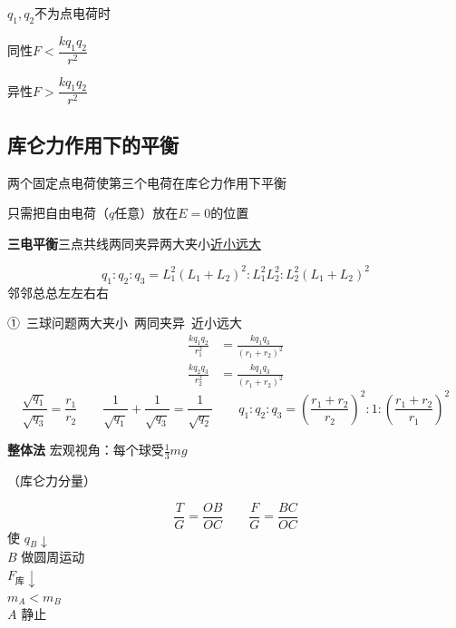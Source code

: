 $q_1,q_2$不为点电荷时


同性\quad $F<\dfrac{kq_1q_2}{r^2}$

异性\quad $F>\dfrac{kq_1q_2}{r^2}$

\subsection{库仑力作用下的平衡}
两个固定点电荷使第三个电荷在库仑力作用下平衡

只需把自由电荷（$q$任意）放在$E=0$的位置

\textbf{三电平衡}\quad 三点共线\quad 两同夹异\quad 两大夹小\quad \underline{近小远大}

\[
q_1:q_2:q_3=L_1^2(L_1+L_2)^2:L_1^2L_2^2:L_2^2(L_1+L_2)^2
\]
邻邻总总\quad 左左右右\quad {}

①\ 三球问题\quad 两大夹小\ 两同夹异\ 近小远大
\begin{align*}
\frac{kq_{1}q_{2}}{r_{1}^{2}}&=\frac{kq_{1}q_{3}}{(r_{1}+r_{2})^{2}}\\
\frac{kq_{2}q_{3}}{r_{2}^{2}}&=\frac{kq_{1}q_{3}}{(r_{1}+r_{2})^{2}}
\end{align*}
\[
\frac{\sqrt{q_{1}}}{\sqrt{q_{3}}}=\frac{r_{1}}{r_{2}}\qquad
\frac{1}{\sqrt{q_{1}}}+\frac{1}{\sqrt{q_{3}}}=\frac{1}{\sqrt{q_{2}}}\qquad
q_{1}:q_{2}:q_{3}=\left(\frac{r_{1}+r_{2}}{r_{2}}\right)^{2}:1:\left(\frac{r_{1}+r_{2}}{r_{1}}\right)^{2}
\]

\textbf{整体法}
宏观视角：每个球受$\frac13mg$

（库仑力分量）

\[
\frac{T}{G}=\frac{OB}{OC}\qquad \frac{F}{G}=\frac{BC}{OC}
\]
使 $q_B\downarrow$ \\
$B$ 做圆周运动 \\
$F_{\text{库}}\downarrow$ \\
$m_A<m_B$ \\
$A$ 静止

